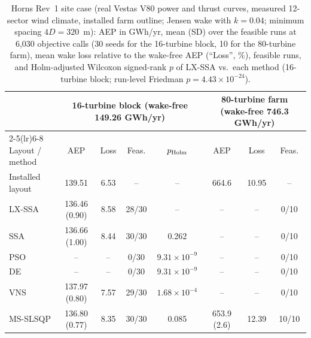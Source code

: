 \begin{table}[!t]
\centering
\caption{Horns Rev~1 site case (real Vestas V80 power and thrust curves, measured 12-sector wind climate, installed farm outline; Jensen wake with $k=0.04$; minimum spacing $4D=320$~m): AEP in GWh/yr, mean (SD) over the feasible runs at 6,030 objective calls (30 seeds for the 16-turbine block, 10 for the 80-turbine farm), mean wake loss relative to the wake-free AEP (``Loss'', \%), feasible runs, and Holm-adjusted Wilcoxon signed-rank $p$ of LX-SSA vs.\ each method (16-turbine block; run-level Friedman $p=4.43\times10^{-24}$).}
\label{tab:hr-site}
\footnotesize\setlength{\tabcolsep}{4pt}
\begin{tabular}{lccccccc}
\toprule
& \multicolumn{4}{c}{16-turbine block (wake-free 149.26 GWh/yr)} & \multicolumn{3}{c}{80-turbine farm (wake-free 746.3 GWh/yr)} \\
\cmidrule(lr){2-5}\cmidrule(lr){6-8}
Layout / method & AEP & Loss & Feas. & $p_{\rm Holm}$ & AEP & Loss & Feas. \\
\midrule
Installed layout & 139.51 & 6.53 & -- & -- & 664.6 & 10.95 & -- \\
\midrule
LX-SSA & 136.46 (0.90) & 8.58 & 28/30 & -- & -- & -- & 0/10 \\
SSA & 136.66 (1.00) & 8.44 & 30/30 & 0.262 & -- & -- & 0/10 \\
PSO & -- & -- & 0/30 & $9.31\times10^{-9}$ & -- & -- & 0/10 \\
DE & -- & -- & 0/30 & $9.31\times10^{-9}$ & -- & -- & 0/10 \\
VNS & 137.97 (0.80) & 7.57 & 29/30 & $1.68\times10^{-4}$ & -- & -- & 0/10 \\
MS-SLSQP & 136.80 (0.77) & 8.35 & 30/30 & 0.085 & 653.9 (2.6) & 12.39 & 10/10 \\
\bottomrule
\end{tabular}
\end{table}

